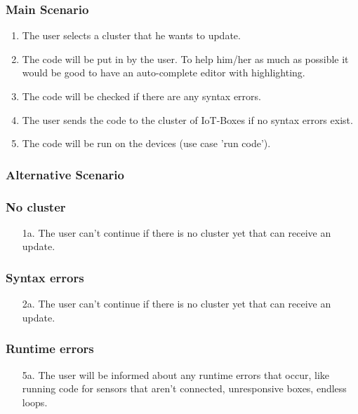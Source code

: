 \documentclass[notitlepage]{article}
\begin{document}
\subsubsection{Main Scenario}
\begin{enumerate}
	\item The user selects a cluster that he wants to update.
	      
	\item The code will be put in by the user. To help him/her as much as possible it would be good to have an auto-complete editor with highlighting.
	      
	\item The code will be checked if there are any syntax errors.
	      
	\item The user sends the code to the cluster of IoT-Boxes if no syntax errors exist.
	      
	\item The code will be run on the devices (use case 'run code').
	      
\end{enumerate}

\subsubsection{Alternative Scenario}
\subsubsection*{No cluster}
\begin{enumerate}
	\item[1a.]{The user can't continue if there is no cluster yet that can receive an update.}
\end{enumerate}

\subsubsection*{Syntax errors}
\begin{enumerate}
	\item[2a.]{The user can't continue if there is no cluster yet that can receive an update.}
\end{enumerate}

\subsubsection*{Runtime errors}
\begin{enumerate}
	\item[5a.]{The user will be informed about any runtime errors that occur, like running code for sensors that aren't connected, unresponsive boxes, endless loops.}
\end{enumerate}
\end{document}
